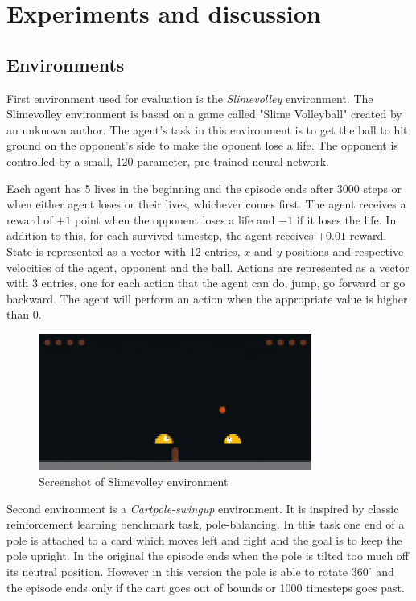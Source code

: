 \chapter{Experiments and discussion}
\section{Environments}

First environment used for evaluation is the \emph{Slimevolley} environment. The Slimevolley environment \cite{slimevolleygym} is based on a game called "Slime Volleyball" created by an unknown author. The agent's task in this environment is to get the ball to hit ground on the opponent's side to make the oponent lose a life. The opponent is controlled by a small, 120-parameter, pre-trained neural network. \cite{ha2015slimevolley}

Each agent has 5 lives in the beginning and the episode ends after 3000 steps or when either agent loses or their lives, whichever comes first. The agent receives a reward of $+1$ point when the opponent loses a life and $-1$ if it loses the life. In addition to this, for each survived timestep, the agent receives $+0.01$  reward. State is represented as a vector with 12 entries, $x$ and $y$ positions and respective velocities of the agent, opponent and the ball. Actions are represented as a vector with 3 entries, one for each action that the agent can do, jump, go forward or go backward. The agent will perform an action when the appropriate value is higher than 0.

\begin{figure}[h]
    \caption{Screenshot of Slimevolley environment}
    \includegraphics[width=0.8\textwidth]{img/slimevolley.png}
\end{figure}

Second environment is a \emph{Cartpole-swingup} environment. It is inspired by classic reinforcement learning benchmark task, pole-balancing. In this task one end of a pole is attached to a card which moves left and right and the goal is to keep the pole upright. In the original the episode ends when the pole is tilted too much off its neutral position. However in this version the pole is able to rotate $360^\circ$ and the episode ends only if the cart goes out of bounds or 1000 timesteps goes past.

